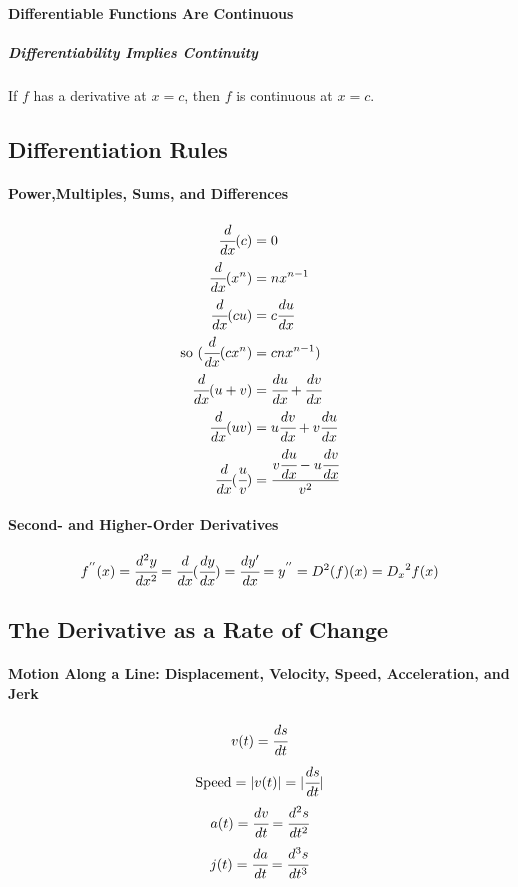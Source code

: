 \documentclass{article}
\begin{document}
            \paragraph{Differentiable Functions Are Continuous}
            \subparagraph{Differentiability Implies Continuity} If $f$ has a derivative at $x=c$, then $f$ is continuous at $x=c$.
        \subsection{Differentiation Rules}
            \paragraph{Power,Multiples, Sums, and Differences}
            \begin{equation}
                \begin{aligned}
                    \cfrac{d}{dx}(c)&=0\\
                    \cfrac{d}{dx}(x^n)&=nx^{n-1}\\
                    \cfrac{d}{dx}(cu)&=c\cfrac{du}{dx}\\
                    \text{so }(\cfrac{d}{dx}(cx^n)&=cnx^{n-1})\\
                    \cfrac{d}{dx}(u+v)&=\cfrac{du}{dx}+\cfrac{dv}{dx}\\
                    \cfrac{d}{dx}(uv)&=u\cfrac{dv}{dx}+v\cfrac{du}{dx}\\
                    \cfrac{d}{dx}(\cfrac{u}{v})&=\cfrac{v\cfrac{du}{dx}-u\cfrac{dv}{dx}}{v^2}\\
                \end{aligned}  
            \end{equation}
            \paragraph{Second- and Higher-Order Derivatives}
            \[f^{''}(x)=\cfrac{d^2y}{dx^2}=\cfrac{d}{dx}(\cfrac{dy}{dx})=\cfrac{dy'}{dx}=y^{''}=D^2(f)(x)={D_x}^2f(x)\]
        \subsection{The Derivative as a Rate of Change}
            \paragraph{Motion Along a Line: Displacement, Velocity, Speed, Acceleration, and Jerk}
            \[v(t)=\cfrac{ds}{dt}\]
            \[\text{Speed}=\lvert v(t) \rvert= \lvert \cfrac{ds}{dt} \rvert\]
            \[a(t)=\cfrac{dv}{dt}=\cfrac{d^2 s}{dt^2}\]
            \[j(t)=\cfrac{da}{dt}=\cfrac{d^3 s}{dt^3}\]
\end{document}
